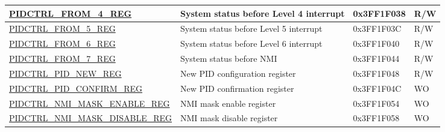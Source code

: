 \begin{longtable}{ | p{5.8cm} | p{6.2cm} | p{2cm} | p{1cm} | }
\hyperref[regdesc:PIDCTRLFROMnREG]{PIDCTRL\_FROM\_4\_REG} & System status before Level 4 interrupt & 0x3FF1F038 & R/W \\ \hline
\hyperref[regdesc:PIDCTRLFROMnREG]{PIDCTRL\_FROM\_5\_REG} & System status before Level 5 interrupt & 0x3FF1F03C & R/W \\ \hline
\hyperref[regdesc:PIDCTRLFROMnREG]{PIDCTRL\_FROM\_6\_REG} & System status before Level 6 interrupt & 0x3FF1F040 & R/W \\ \hline
\hyperref[regdesc:PIDCTRLFROMnREG]{PIDCTRL\_FROM\_7\_REG} & System status before NMI & 0x3FF1F044 & R/W \\ \hline
\hyperref[regdesc:PIDCTRLPIDNEWREG]{PIDCTRL\_PID\_NEW\_REG} & New PID configuration register & 0x3FF1F048 & R/W \\ \hline
\hyperref[regdesc:PIDCTRLPIDCONFIRMREG]{PIDCTRL\_PID\_CONFIRM\_REG} & New PID confirmation register & 0x3FF1F04C & WO \\ \hline
\hyperref[regdesc:PIDCTRLNMIMASKENABLEREG]{PIDCTRL\_NMI\_MASK\_ENABLE\_REG} & NMI mask enable register & 0x3FF1F054 & WO \\ \hline
\hyperref[regdesc:PIDCTRLNMIMASKDISABLEREG]{PIDCTRL\_NMI\_MASK\_DISABLE\_REG} & NMI mask disable register & 0x3FF1F058 & WO \\ \hline
\end{longtable}
